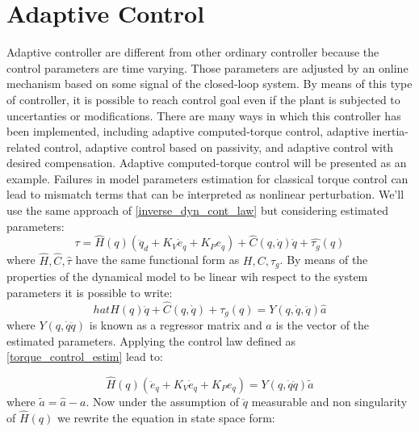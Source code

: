 \section{Adaptive Control}

Adaptive controller are different from other ordinary controller because the control parameters are time varying. Those parameters are adjusted by an online mechanism based on some signal of the closed-loop system. By means of this type of controller, it is possible to reach control goal even if the plant is subjected to uncertanties or modifications. There are many ways in which this controller has been implemented, including adaptive computed-torque control, adaptive inertia-related control, adaptive control based on passivity, and adaptive control with desired
compensation. Adaptive computed-torque control will be presented as an example. Failures in model parameters estimation for classical torque control can lead to mismatch terms that can be interpreted as nonlinear perturbation.
We'll use the same approach of \ref{inverse_dyn_cont_law} but considering estimated parameters:
\begin{equation}
	\tau=\hat{H}(q)(\ddot{q}_d+K_V\dot{e}_q+K_Pe_q)+\hat{C}(q,\dot{q})\dot{q}+\hat{\tau_g}(q)
	\label{torque_control_estim}
\end{equation}
where $\hat{H},\hat{C},\hat{\tau}$ have the same functional form as $H,C,\tau_g$. By means of the properties of the dynamical model to be linear wih respect to the system parameters it is possible to write:
\begin{equation}
	hat{H}(q)\ddot{q}+\hat{C}(q,\dot{q})+\hat{\tau_g}(q)=Y(q,\dot{q}, \ddot{q})\hat{a}
\end{equation}
where $Y(q,\dot{q}\ddot{q})$ is known as a regressor matrix and $a$ is the vector of the estimated parameters. Applying the control law defined as \ref{torque_control_estim} lead to:

\begin{equation}
	\hat{H}(q)(\ddot{e}_q+K_V\dot{e}_q+K_Pe_q)=Y(q,\dot{q}\ddot{q})\tilde{a}
\end{equation} 
where $\tilde{a}=\hat{a}-a$. Now under the assumption of $\ddot{q}$ measurable and non singularity of $\hat{H}(q)$ we rewrite the equation in state space form: 

